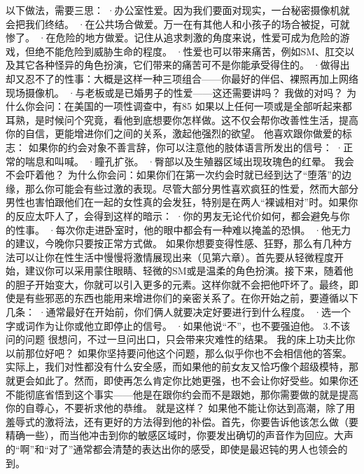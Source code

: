 \documentclass[12pt,UTF8]{ctexbook}
\begin{document}
以下做法，需要三思：
·办公室性爱。因为我们要面对现实，一台秘密摄像机就会把我们终结。
·在公共场合做爱。万一在有其他人和小孩子的场合被捉，可就惨了。
·在危险的地方做爱。记住从追求刺激的角度来说，性爱可成为危险的游戏，但绝不能危险到威胁生命的程度。
·性爱也可以带来痛苦，例如SM、肛交以及其它各种怪异的角色扮演，它们带来的痛苦可不是你能承受得住的。
·做得出却又忍不了的性事：大概是这样一种三项组合——你最好的伴侣、裸照再加上网络现场摄像机。
·与老板或是已婚男子的性爱——这还需要讲吗？
我做的对吗？
为什么你会问：在美国的一项性调查中，有85%
如果以上任何一项或是全部听起来都耳熟，是时候问个究竟，看他到底想要你怎样做。这不仅会帮你改善性生活，提高你的自信，更能增进你们之间的关系，激起他强烈的欲望。
他喜欢跟你做爱的标志：
如果你的约会对象不善言辞，你可以注意他的肢体语言所发出的信号：
·正常的喘息和叫喊。
·瞳孔扩张。
·臀部以及生殖器区域出现玫瑰色的红晕。
我会不会吓着他？
为什么你会问：如果你们在第一次约会时就已经到达了“堕落”的边缘，那么你可能会有些过激的表现。尽管大部分男性喜欢疯狂的性爱，然而大部分男性也害怕跟他们在一起的女性真的会发狂，特别是在两人“裸诚相对”时。如果你的反应太吓人了，会得到这样的暗示：
·你的男友无论代价如何，都会避免与你的性事。
·每次你走进卧室时，他的眼中都会有一种难以掩盖的恐惧。
·他无力的建议，今晚你只要按正常方式做。
如果你想要变得性感、狂野，那么有几种方法可以让你在性生活中慢慢将激情展现出来（见第六章）。首先要从轻微程度开始，建议你可以采用蒙住眼睛、轻微的SM或是温柔的角色扮演。接下来，随着他的胆子开始变大，你就可以引入更多的元素。这样你就不会把他吓坏了。最终，即使是有些邪恶的东西也能用来增进你们的亲密关系了。在你开始之前，要遵循以下几条：
·通常最好在开始前，你们俩人就要决定好要进行到什么程度。
·选一个字或词作为让你或他立即停止的信号。
·如果他说“不”，也不要强迫他。
3.不该问的问题
很想问，不过一旦问出口，只会带来灾难性的结果。
我的床上功夫比你以前那位好吧？
如果你坚持要问他这个问题，那么似乎你也不会相信他的答案。实际上，我们对性都没有什么安全感，而如果他的前女友又恰巧像个超级模特，那就更会如此了。然而，即使再怎么肯定你比她更强，也不会让你好受些。如果你还不能彻底省悟到这个事实——他是在跟你约会而不是跟她，那你需要做的就是提高你的自尊心，不要祈求他的恭维。
就是这样？
如果他不能让你达到高潮，除了用羞辱式的激将法，还有更好的方法得到他的补偿。首先，你要告诉他该怎么做（要精确一些），而当他冲击到你的敏感区域时，你要发出确切的声音作为回应。大声的“啊”和“对了”通常都会清楚的表达出你的感受，即使是最迟钝的男人也领会的到。
\end{document}
